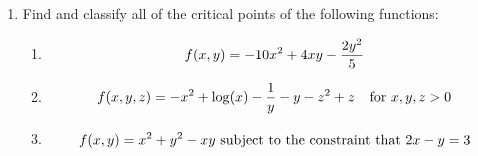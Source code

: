 \documentclass[11pt]{article}
\begin{document}
\begin{enumerate}
\vspace{.2in}

\item Find and classify all of the critical points of the following functions:

\begin{enumerate}

\item  $$f(x, y)=-10x^2+4xy-{{2y^2}\over 5}$$


\item $$f(x, y, z)=-x^2+{\log}(x)-{1\over y}-y-z^2+z \hspace{.1in}\hbox{ for }x, y, z>0$$


\item $$f(x, y)=x^2+y^2-xy \hbox{ subject to the constraint that }2x-y=3$$

\end{enumerate}

\end{enumerate}
\end{document}
